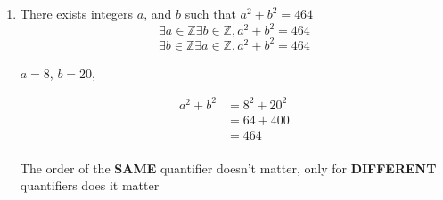 \documentclass[../../Main.tex]{subfiles}
\begin{document}
\begin{example}
\begin{enumerate}
            $$\forall a \in \mathbb{Z}^+ \forall b \in \mathbb{Z}^+, ab >0$$

            \begin{note}
                This is the same as $\forall a, b \in \mathbb{Z}^+$
            \end{note}

            \begin{center}
                \TRUE since $a,b \in \mathbb{Z}^+$, then $a > 0$ and $b > 0$, hence $ab > 0$
            \end{center}

        \item
            There exists integers $a$, and $b$ such that $a^2 + b^2 = 464$
            $$\exists a \in \mathbb{Z} \exists b \in \mathbb{Z}, a^2 + b^2 = 464$$
            $$\exists b \in \mathbb{Z} \exists a \in \mathbb{Z}, a^2 + b^2 = 464$$

            \begin{center}
                \TRUE $a = 8$, $b = 20$, 
                
                \begin{align*}
                    a^2 + b^2 &= 8^2 + 20^2 \\
                    &= 64 + 400 \\
                    &= 464 \\
                \end{align*}
            
            \end{center}

        \begin{note}
            The order of the \textbf{SAME} quantifier doesn't matter, only for \textbf{DIFFERENT} quantifiers does it matter
        \end{note}

    \end{enumerate}

\end{example}
\end{document}
